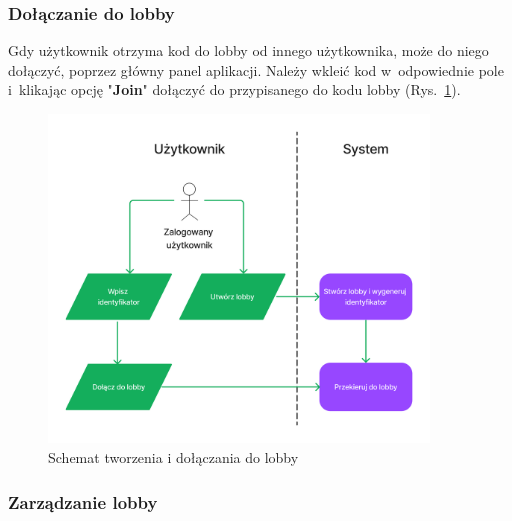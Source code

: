 \subsubsection{Dołączanie do lobby}

Gdy użytkownik otrzyma kod do lobby od innego użytkownika, może
do niego dołączyć, poprzez główny panel aplikacji. Należy wkleić
kod w~odpowiednie pole i~klikając opcję "\textbf{Join}"\xspace
dołączyć do przypisanego do kodu lobby (Rys.~\ref{fig:figma_xd_create_join_lobby}).

\begin{figure}[hbt!]
    \centering
    \includegraphics[width=0.9\textwidth]{img/schematy/create_join_lobby.png}
    \caption{Schemat tworzenia i dołączania do lobby}
    \label{fig:figma_xd_create_join_lobby}
\end{figure}

\FloatBarrier


\subsubsection{Zarządzanie lobby}

